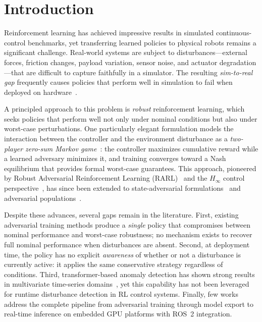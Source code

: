\documentclass[conference]{IEEEtran}
\begin{document}
\section{Introduction}\label{sec:intro}

Reinforcement learning has achieved impressive results in simulated
continuous-control benchmarks, yet transferring learned policies to physical
robots remains a significant challenge.  Real-world systems are subject to
disturbances---external forces, friction changes, payload variation,
sensor noise, and actuator degradation---that are difficult to capture
faithfully in a simulator.  The resulting \emph{sim-to-real gap} frequently
causes policies that perform well in simulation to fail when deployed on
hardware~\cite{zhao2020simtoreal}.

A principled approach to this problem is \emph{robust} reinforcement
learning, which seeks policies that perform well not only under nominal
conditions but also under worst-case perturbations.  One particularly
elegant formulation models the interaction between the controller and the
environment disturbance as a \emph{two-player zero-sum Markov
game}~\cite{littman1994markov}: the controller maximizes cumulative reward
while a learned adversary minimizes it, and training converges toward a
Nash equilibrium that provides formal worst-case guarantees.  This approach,
pioneered by Robust Adversarial Reinforcement Learning
(RARL)~\cite{pinto2017robust} and the $H_\infty$ control
perspective~\cite{morimoto2005robust}, has since been extended to
state-adversarial formulations~\cite{zhang2020robust} and adversarial
populations~\cite{vinitsky2020robust}.

Despite these advances, several gaps remain in the literature.  First,
existing adversarial training methods produce a \emph{single} policy that
compromises between nominal performance and worst-case robustness; no
mechanism exists to recover full nominal performance when disturbances are
absent.  Second, at deployment time, the policy has no explicit
\emph{awareness} of whether or not a disturbance is currently active: it
applies the same conservative strategy regardless of conditions.  Third,
transformer-based anomaly detection has shown strong results in multivariate
time-series domains~\cite{tuli2022tranad, xu2022anomaly}, yet this
capability has not been leveraged for runtime disturbance detection in RL
control systems.  Finally, few works address the complete pipeline from
adversarial training through model export to real-time inference on embedded
GPU platforms with ROS~2 integration.
\end{document}
